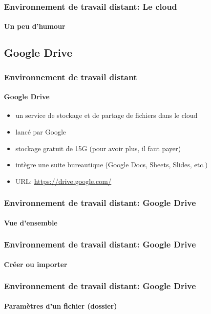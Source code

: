 \documentclass[xcolor=table]{beamer}
\begin{document}
\begin{frame}
\frametitle{Environnement de travail distant: Le cloud}
\framesubtitle{Un peu d'humour}

\begin{center}
\end{center}

\end{frame}

\subsection{Google Drive}

\begin{frame}
\frametitle{Environnement de travail distant}
\framesubtitle{Google Drive}

\begin{itemize}
	\item un service de stockage et de partage de fichiers dans le cloud
	\item lancé par Google
	\item stockage gratuit de 15G (pour avoir plus, il faut payer)
	\item intègre une suite bureautique (Google Docs, Sheets, Slides, etc.)
	\item URL: \url{https://drive.google.com/}
\end{itemize}

\end{frame}


\begin{frame}
\frametitle{Environnement de travail distant: Google Drive}
\framesubtitle{Vue d'ensemble}

\begin{center}
\end{center}

\end{frame}

\begin{frame}
\frametitle{Environnement de travail distant: Google Drive}
\framesubtitle{Créer ou importer}

\begin{center}
\end{center}

\end{frame}

\begin{frame}
\frametitle{Environnement de travail distant: Google Drive}
\framesubtitle{Paramètres d'un fichier (dossier)}

\begin{center}
\end{center}

\end{frame}
\end{document}
